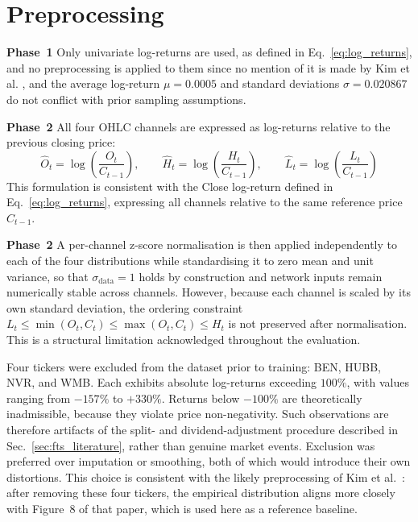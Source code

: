 \section{Preprocessing}

\textbf{Phase~1} \quad Only univariate log-returns are used, as defined in Eq.\ \ref{eq:log_returns}, and no preprocessing is applied to them since no mention of it is made by Kim et al. \cite{kim2025diffusion}, and the average log-return \(\mu=0.0005\) and standard deviations \(\sigma=0.020867\) do not conflict with prior sampling assumptions.

\textbf{Phase~2} \quad All four OHLC channels are expressed as log-returns relative to the previous closing price:
\begin{equation}
\label{eq:preprocessed_data}
    \hat{O}_t = \log\!\left(\frac{O_t}{C_{t-1}}\right), \qquad
    \hat{H}_t = \log\!\left(\frac{H_t}{C_{t-1}}\right), \qquad
    \hat{L}_t = \log\!\left(\frac{L_t}{C_{t-1}}\right)
\end{equation}
This formulation is consistent with the Close log-return defined in Eq.\ \ref{eq:log_returns},
expressing all channels relative to the same reference price \(C_{t-1}\).

\textbf{Phase~2} \quad A per-channel z-score normalisation is then applied independently to each of the four
distributions while standardising it to zero mean and unit variance, so that
\(\sigma_{\text{data}} = 1\) holds by construction and network inputs remain numerically
stable across channels. However, because each channel is scaled by its own standard
deviation, the ordering constraint \(L_t \leq \min(O_t, C_t) \leq \max(O_t, C_t) \leq H_t\) is not preserved after normalisation. This is a structural
limitation acknowledged throughout the evaluation.

Four tickers were excluded from the dataset prior to training: BEN, HUBB, NVR, 
and WMB. Each exhibits absolute log-returns exceeding $100\%$, with values 
ranging from $-157\%$ to $+330\%$. Returns below $-100\%$ are theoretically 
inadmissible, because they violate price non-negativity. Such observations are therefore artifacts of the split- and dividend-adjustment procedure described in 
Sec.\ \ref{sec:fts_literature}, rather than genuine market events. Exclusion was 
preferred over imputation or smoothing, both of which would introduce their own 
distortions. This choice is consistent with the likely preprocessing of Kim 
et al.\ \cite{kim2025diffusion}: after removing these four tickers, the empirical 
distribution aligns more closely with Figure~8 of that paper, 
which is used here as a reference baseline.

